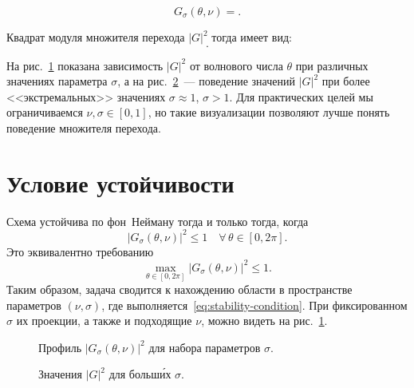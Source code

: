 \documentclass[14pt]{report}
\begin{document}
\begin{dmath*}
G_{\sigma}(\theta,\nu) =
.
\end{dmath*}

Квадрат модуля множителя перехода $|G|^2$ тогда имеет вид:
\begin{dmath*}
%
.
\end{dmath*}

На рис.~\ref{fig:amplification-factor-parameter-profile} показана зависимость $|G|^2$ от волнового числа $\theta$ при различных значениях параметра $\sigma$, а на рис.~\ref{fig:extremal-paramter-amplification-factor-parameter-profile}~--- поведение значений $|G|^2$ при более <<экстремальных>> значениях $\sigma \approx 1$, $\sigma > 1$. Для практических целей мы ограничиваемся $\nu, \sigma \in [0, 1]$, но такие визуализации позволяют лучше понять поведение множителя перехода.

\section{Условие устойчивости}
Схема устойчива по фон~Нейману тогда и только тогда, когда
\begin{equation}
|G_{\sigma}(\theta,\nu)|^2 \le 1 \quad \forall\,\theta\in[0,2\pi].
\label{eq:stability-condition}
\end{equation}
Это эквивалентно требованию
\[
\max_{\theta\in[0,2\pi]} |G_{\sigma}(\theta,\nu)|^2 \le 1.
\]
Таким образом, задача сводится к нахождению области в пространстве параметров $(\nu,\sigma)$, где выполняется~\eqref{eq:stability-condition}. При фиксированном $\sigma$ их проекции, а также и подходящие $\nu$, можно видеть на рис.~\ref{fig:amplification-factor-parameter-profile}.

\begin{figure}[ht]
\centering
\scalebox{.5}{}
\caption{Профиль $|G_{\sigma}(\theta,\nu)|^2$ для набора параметров $\sigma$.}
\label{fig:amplification-factor-parameter-profile}
\end{figure}

\begin{figure}[ht]
\centering
\scalebox{.5}{}
\caption{Значения $|G|^2$ для больш\'{и}х $\sigma$.}
\label{fig:extremal-paramter-amplification-factor-parameter-profile}
\end{figure}
\end{document}
